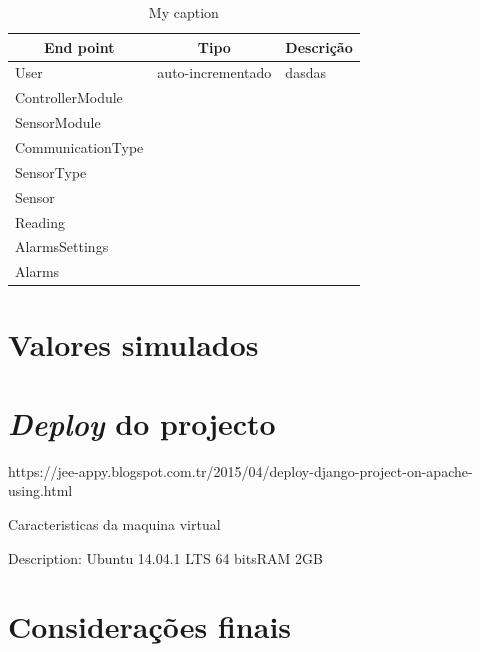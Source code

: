 \begin{table}[h]
	\centering
	\begin{tabular}{|l|l|l|}
		\hline
		\multicolumn{1}{|c|}{\textbf{End point}} & \multicolumn{1}{c|}{\textbf{Tipo}} & \multicolumn{1}{c|}{\textbf{Descrição}} \\ \hline
		User & auto-incrementado & dasdas \\ \hline
		ControllerModule&  &  \\ \hline
		SensorModule&  &  \\ \hline
		CommunicationType&  &  \\ \hline
		SensorType&  &  \\ \hline
		Sensor&  &  \\ \hline
		Reading&  &  \\ \hline
		AlarmsSettings&  &  \\ \hline
		Alarms&  &  \\ \hline
	\end{tabular}
	\caption{My caption}
	\label{my-label}
\end{table}





\section{Valores simulados}



\section{\textit{Deploy} do projecto}


https://jee-appy.blogspot.com.tr/2015/04/deploy-django-project-on-apache-using.html

Caracteristicas da maquina virtual

Description:	Ubuntu 14.04.1 LTS
64 bitsRAM 2GB 

\section{Considerações finais}








